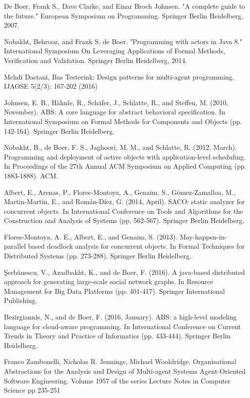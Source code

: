 \documentclass[runningheads,a4paper]{llncs}
\begin{document}












\begin{thebibliography}{4}

De Boer, Frank S., Dave Clarke, and Einar Broch Johnsen. "A complete guide to the future." European Symposium on Programming. Springer Berlin Heidelberg, 2007.

 Nobakht, Behrooz, and Frank S. de Boer. "Programming with actors in Java 8." International Symposium On Leveraging Applications of Formal Methods, Verification and Validation. Springer Berlin Heidelberg, 2014.

 	Mehdi Dastani, Bas Testerink:
Design patterns for multi-agent programming. IJAOSE 5(2/3): 167-202 (2016)

 Johnsen, E. B., Hähnle, R., Schäfer, J., Schlatte, R., and Steffen, M. (2010, November). ABS: A core language for abstract behavioral specification. In International Symposium on Formal Methods for Components and Objects (pp. 142-164). Springer Berlin Heidelberg.

 Nobakht, B., de Boer, F. S., Jaghoori, M. M., and Schlatte, R. (2012, March). Programming and deployment of active objects with application-level scheduling. In Proceedings of the 27th Annual ACM Symposium on Applied Computing (pp. 1883-1888). ACM.

 Albert, E., Arenas, P., Flores-Montoya, A., Genaim, S., Gómez-Zamalloa, M., Martin-Martin, E., and Román-Díez, G. (2014, April). SACO: static analyzer for concurrent objects. In International Conference on Tools and Algorithms for the Construction and Analysis of Systems (pp. 562-567). Springer Berlin Heidelberg.

Flores-Montoya, A. E., Albert, E., and Genaim, S. (2013). May-happen-in-parallel based deadlock analysis for concurrent objects. In Formal Techniques for Distributed Systems (pp. 273-288). Springer Berlin Heidelberg.

Şerbănescu, V., Azadbakht, K., and de Boer, F. (2016). A java-based distributed approach for generating large-scale social network graphs. In Resource Management for Big Data Platforms (pp. 401-417). Springer International Publishing.

 Bezirgiannis, N., and de Boer, F. (2016, January). ABS: a high-level modeling language for cloud-aware programming. In International Conference on Current Trends in Theory and Practice of Informatics (pp. 433-444). Springer Berlin Heidelberg.

Franco Zambonelli, Nicholas R. Jennings, Michael Wooldridge. 
Organisational Abstractions for the Analysis and Design of Multi-agent Systems
Agent-Oriented Software Engineering. Volume 1957 of the series Lecture Notes in Computer Science pp 235-251


\end{thebibliography}
\end{document}
